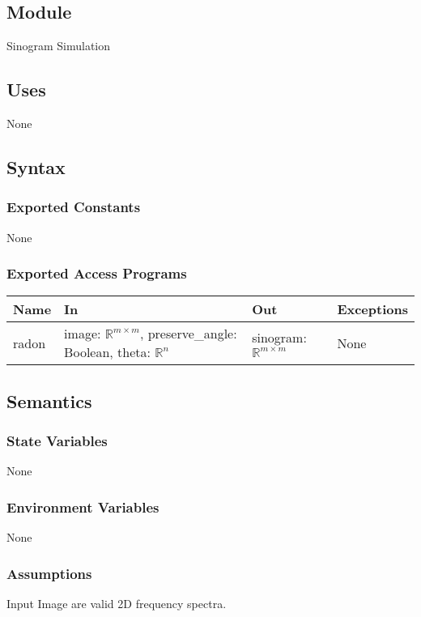 \documentclass[12pt, titlepage]{article}
\begin{document}
\subsection{Module}
Sinogram Simulation

\subsection{Uses}
None

\subsection{Syntax}

\subsubsection{Exported Constants}
None

\subsubsection{Exported Access Programs}

\begin{center}
\begin{tabular}{|l|m{18em}|l|l|}
\hline
\textbf{Name} & \textbf{In} & \textbf{Out} & \textbf{Exceptions} \\
\hline
radon & image: \(\mathbb{R}^{m \times m}\), preserve\_angle: Boolean, theta: \(\mathbb{R}^{n}\) & sinogram: \(\mathbb{R}^{m \times m}\) & None \\
\hline
\end{tabular}
\end{center}

\subsection{Semantics}

\subsubsection{State Variables}
None

\subsubsection{Environment Variables}
None

\subsubsection{Assumptions}
Input Image are valid 2D frequency spectra.
\end{document}
